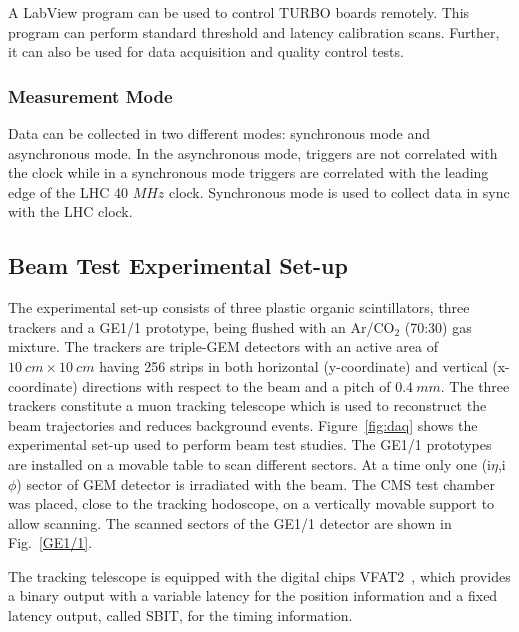 A LabView program can be used to control TURBO boards remotely.
This program can perform standard threshold and latency calibration scans. Further, it can also be used for data acquisition and quality control tests.


\subsubsection{Measurement Mode} %
\label{ssub:measurement_mode}
Data can be collected in two different modes: synchronous mode and asynchronous mode. In the asynchronous mode, triggers are not correlated with the clock while in a synchronous mode triggers are correlated with the leading edge of the LHC 40 $MHz$ clock. Synchronous mode is used to collect data in sync with the LHC clock.

\subsection{Beam Test Experimental Set-up}
The experimental set-up consists of three plastic organic scintillators, three trackers and a GE1/1 prototype, being flushed with an Ar/CO$_{2}$ (70:30) gas mixture.
The trackers are triple-GEM detectors with an active area of $10~cm\times10~cm$ having 256 strips in both horizontal (y-coordinate) and vertical (x-coordinate) directions with respect to the beam and a pitch of $0.4~mm$.
The three trackers constitute a muon tracking telescope which is used to reconstruct the beam trajectories and reduces background events.
Figure~\ref{fig:daq} shows the experimental set-up used to perform beam test studies.
The GE1/1 prototypes are installed on a movable table to scan different sectors. At a time only one (i$\eta$,i$\phi$) sector of GEM detector is irradiated with the beam.
The CMS test chamber was placed, close to the tracking hodoscope, on a vertically movable support to allow scanning. The scanned sectors of the GE1/1 detector are shown in Fig.~\ref{GE1/1}.

The tracking telescope is equipped with the digital chips VFAT2~\cite{Aspell:2008zz}, which provides a binary output with a variable latency for the position information and a fixed latency output, called SBIT, for the timing information.

